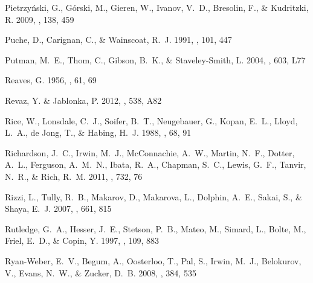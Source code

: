 \documentclass[manuscript]{aastex}
\begin{document}
\begin{thebibliography}{381}
{Pietrzy{\'n}ski}, G., {G{\'o}rski}, M., {Gieren}, W., {Ivanov}, V.~D.,
  {Bresolin}, F., \& {Kudritzki}, R. 2009, \aj, 138, 459

{Puche}, D., {Carignan}, C., \& {Wainscoat}, R.~J. 1991, \aj, 101, 447

{Putman}, M.~E., {Thom}, C., {Gibson}, B.~K., \& {Staveley-Smith}, L. 2004,
  \apjl, 603, L77

{Reaves}, G. 1956, \aj, 61, 69

{Revaz}, Y. \& {Jablonka}, P. 2012, \aap, 538, A82

{Rice}, W., {Lonsdale}, C.~J., {Soifer}, B.~T., {Neugebauer}, G., {Kopan},
  E.~L., {Lloyd}, L.~A., {de Jong}, T., \& {Habing}, H.~J. 1988, \apjs, 68, 91

{Richardson}, J.~C., {Irwin}, M.~J., {McConnachie}, A.~W., {Martin}, N.~F.,
  {Dotter}, A.~L., {Ferguson}, A.~M.~N., {Ibata}, R.~A., {Chapman}, S.~C.,
  {Lewis}, G.~F., {Tanvir}, N.~R., \& {Rich}, R.~M. 2011, \apj, 732, 76

{Rizzi}, L., {Tully}, R.~B., {Makarov}, D., {Makarova}, L., {Dolphin}, A.~E.,
  {Sakai}, S., \& {Shaya}, E.~J. 2007, \apj, 661, 815

{Rutledge}, G.~A., {Hesser}, J.~E., {Stetson}, P.~B., {Mateo}, M., {Simard},
  L., {Bolte}, M., {Friel}, E.~D., \& {Copin}, Y. 1997, \pasp, 109, 883

{Ryan-Weber}, E.~V., {Begum}, A., {Oosterloo}, T., {Pal}, S., {Irwin}, M.~J.,
  {Belokurov}, V., {Evans}, N.~W., \& {Zucker}, D.~B. 2008, \mnras, 384, 535


\end{thebibliography}
\end{document}
